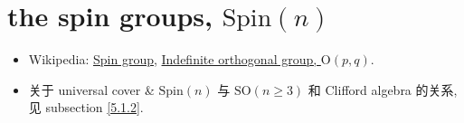 \chapter{the spin groups, \texorpdfstring{$\mathrm{Spin}(n)$}{Spin(n)}}
\begin{itemize}
	\item Wikipedia: \href{https://en.wikipedia.org/wiki/Spin_group}{Spin group}, \href{https://en.wikipedia.org/wiki/Indefinite_orthogonal_group}{Indefinite orthogonal group, $\mathrm{O}(p, q)$}.
	
	\item 关于 universal cover \& $\mathrm{Spin}(n)$ 与 $\mathrm{SO}(n \geq 3)$ 和 Clifford algebra 的关系, 见 subsection \ref{5.1.2}.
\end{itemize}
